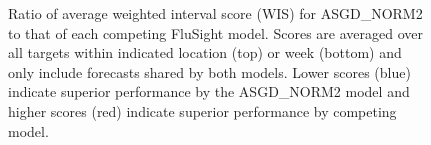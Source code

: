 \documentclass[ba]{imsart}
\theoremstyle{plain}
\theoremstyle{definition}
\theoremstyle{remark}
\begin{document}
\begin{supplement}
\begin{figure}[hbt!]
\begin{adjustwidth}{-1.2cm}{-1.5cm}
    \centering
    \end{adjustwidth}
    \caption{Ratio of average weighted interval score (WIS) for ASGD\_NORM2 
    to that of each competing FluSight model. Scores are averaged
    over all targets within indicated location (top) or week (bottom) and 
    only include forecasts shared by both models. Lower scores (blue) indicate
    superior performance by the ASGD\_NORM2 model and higher scores (red)
    indicate superior performance by competing model.}
    \label{fig:state_and_date_wis}
    
\end{figure}

%     






\end{supplement}








\end{document}
